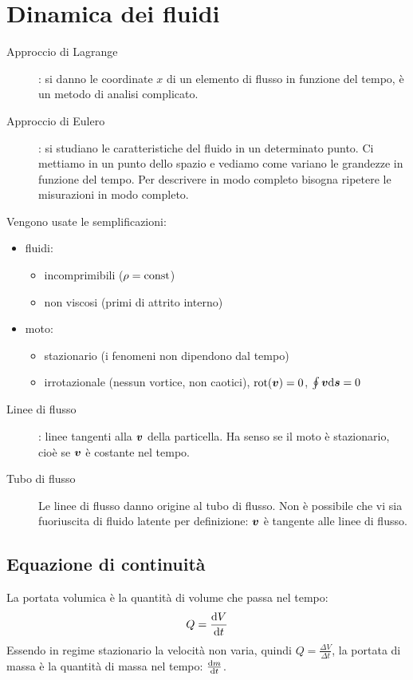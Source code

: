 \section{Dinamica dei fluidi}
\begin{description}
   \item[Approccio di Lagrange]: si danno le coordinate $x$ di un elemento di flusso in funzione del tempo, è un metodo di analisi complicato.
   \item[Approccio di Eulero]: si studiano le caratteristiche del fluido in un determinato punto. Ci mettiamo in un punto dello spazio e vediamo come variano le grandezze in funzione del tempo. Per descrivere in modo completo bisogna ripetere le misurazioni in modo completo.
\end{description}
Vengono usate le semplificazioni:
\begin{itemize}
   \item fluidi:
         \begin{itemize}
            \item incomprimibili ($\rho=\text{const}$)
            \item non viscosi (primi di attrito interno)
         \end{itemize}
   \item moto:
         \begin{itemize}
            \item stazionario (i fenomeni non dipendono dal tempo)
            \item irrotazionale (nessun vortice, non caotici), $\mathrm{rot}(\boldsymbol{v})=0$, $\oint \boldsymbol{v} \mathrm{d} \boldsymbol{s}=0$
         \end{itemize}
\end{itemize}
\begin{description}
   \item [Linee di flusso]: linee tangenti alla $\boldsymbol{v}$ della particella. Ha senso se il moto è stazionario, cioè se $\boldsymbol{v}$ è costante nel tempo.
   \item[Tubo di flusso] Le linee di flusso danno origine al tubo di flusso. Non è possibile che vi sia fuoriuscita di fluido latente per definizione: $\boldsymbol{v}$ è tangente alle linee di flusso.
\end{description}

\subsection{Equazione di continuità}
\begin{Def}[Portata]
   La portata volumica è la quantità di volume che passa nel tempo: \[Q=\frac{\mathrm{d} V}{\mathrm{d} t}\]
   Essendo in regime stazionario la velocità non varia, quindi $Q=\frac{\Delta V}{\Delta t}$, la portata di massa è la quantità di massa nel tempo: $\frac{\mathrm{d} m}{\mathrm{d} t}$.
\end{Def}

